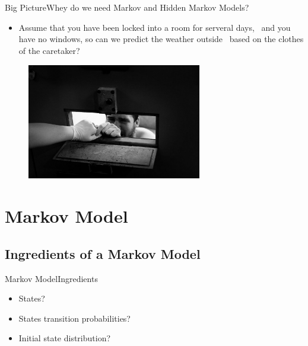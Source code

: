 \documentclass[10pt]{beamer}
\begin{document}
\begin{frame}{Big Picture}{Whey do we need Markov and Hidden Markov Models?}
 \label{kidnapping_example}
  \begin{itemize}
    \item Assume that you have been locked into a room for serveral days, \
          and you have no windows, so can we predict the weather outside \
          based on the clothes of the caretaker?\cite{Anders}
  \end{itemize}
  \begin{figure}[h]
    \centering
    \includegraphics[width=3in,height=2in]{figures/prisoner.jpg}
  \end{figure}
\end{frame}

\section{Markov Model}
\subsection{Ingredients of a Markov Model}
\begin{frame}{Markov Model}{Ingredients}
  \begin{itemize}
    \item States?
    \item States transition probabilities?
    \item Initial state distribution? 
  \end{itemize}
\end{frame}
\end{document}
